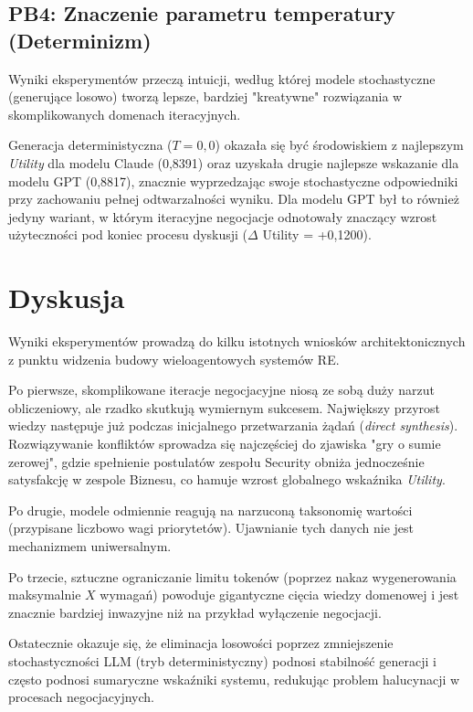\documentclass[conference]{IEEEtran}
\begin{document}
\subsection{PB4: Znaczenie parametru temperatury (Determinizm)}

Wyniki eksperymentów przeczą intuicji, według której modele stochastyczne (generujące losowo) tworzą lepsze, bardziej "kreatywne" rozwiązania w skomplikowanych domenach iteracyjnych.

Generacja deterministyczna ($T=0{,}0$) okazała się być środowiskiem z najlepszym \textit{Utility} dla modelu Claude (0,8391) oraz uzyskała drugie najlepsze wskazanie dla modelu GPT (0,8817), znacznie wyprzedzając swoje stochastyczne odpowiedniki przy zachowaniu pełnej odtwarzalności wyniku. Dla modelu GPT był to również jedyny wariant, w którym iteracyjne negocjacje odnotowały znaczący wzrost użyteczności pod koniec procesu dyskusji ($\Delta$ Utility = +0,1200). 

\section{Dyskusja}

Wyniki eksperymentów prowadzą do kilku istotnych wniosków architektonicznych z punktu widzenia budowy wieloagentowych systemów RE.

Po pierwsze, skomplikowane iteracje negocjacyjne niosą ze sobą duży narzut obliczeniowy, ale rzadko skutkują wymiernym sukcesem. Największy przyrost wiedzy następuje już podczas inicjalnego przetwarzania żądań (\textit{direct synthesis}). Rozwiązywanie konfliktów sprowadza się najczęściej do zjawiska "gry o sumie zerowej", gdzie spełnienie postulatów zespołu Security obniża jednocześnie satysfakcję w zespole Biznesu, co hamuje wzrost globalnego wskaźnika \textit{Utility}.

Po drugie, modele odmiennie reagują na narzuconą taksonomię wartości (przypisane liczbowo wagi priorytetów). Ujawnianie tych danych nie jest mechanizmem uniwersalnym. 

Po trzecie, sztuczne ograniczanie limitu tokenów (poprzez nakaz wygenerowania maksymalnie $X$ wymagań) powoduje gigantyczne cięcia wiedzy domenowej i jest znacznie bardziej inwazyjne niż na przykład wyłączenie negocjacji.

Ostatecznie okazuje się, że eliminacja losowości poprzez zmniejszenie stochastyczności LLM (tryb deterministyczny) podnosi stabilność generacji i często podnosi sumaryczne wskaźniki systemu, redukując problem halucynacji w procesach negocjacyjnych.
\end{document}

